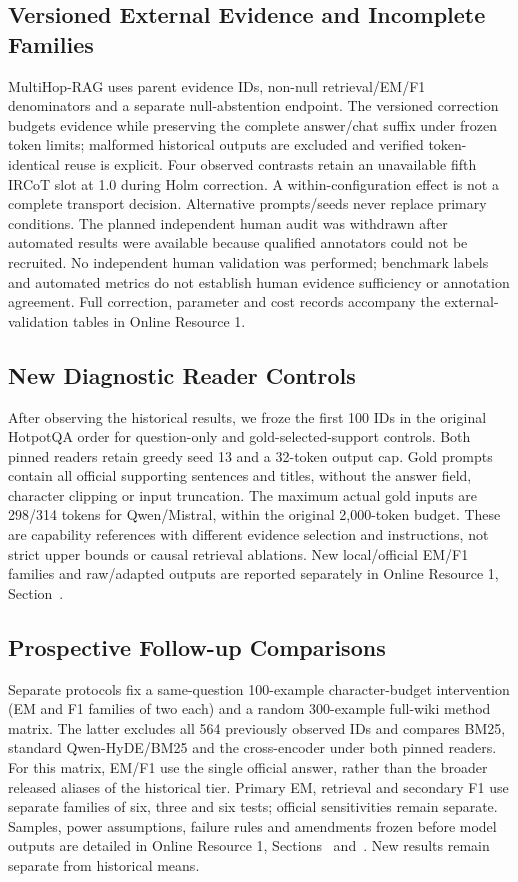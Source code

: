 \subsection{Versioned External Evidence and Incomplete Families}
\label{sec:mhrag_method_gate}

MultiHop-RAG uses parent evidence IDs, non-null retrieval/EM/F1 denominators and a separate null-abstention endpoint. The versioned correction budgets evidence while preserving the complete answer/chat suffix under frozen token limits; malformed historical outputs are excluded and verified token-identical reuse is explicit. Four observed contrasts retain an unavailable fifth IRCoT slot at 1.0 during Holm correction. A within-configuration effect is not a complete transport decision. Alternative prompts/seeds never replace primary conditions. The planned independent human audit was withdrawn after automated results were available because qualified annotators could not be recruited. No independent human validation was performed; benchmark labels and automated metrics do not establish human evidence sufficiency or annotation agreement. Full correction, parameter and cost records accompany the external-validation tables in Online Resource 1.

\subsection{New Diagnostic Reader Controls}
\label{sec:new_reader_controls_method}
After observing the historical results, we froze the first 100 IDs in the original HotpotQA order for question-only and gold-selected-support controls. Both pinned readers retain greedy seed 13 and a 32-token output cap. Gold prompts contain all official supporting sentences and titles, without the answer field, character clipping or input truncation. The maximum actual gold inputs are 298/314 tokens for Qwen/Mistral, within the original 2,000-token budget. These are capability references with different evidence selection and instructions, not strict upper bounds or causal retrieval ablations. New local/official EM/F1 families and raw/adapted outputs are reported separately in Online Resource 1, Section~.

\subsection{Prospective Follow-up Comparisons}
\label{sec:followup_comparisons_method}
Separate protocols fix a same-question 100-example character-budget intervention (EM and F1 families of two each) and a random 300-example full-wiki method matrix. The latter excludes all 564 previously observed IDs and compares BM25, standard Qwen-HyDE/BM25 and the cross-encoder under both pinned readers. For this matrix, EM/F1 use the single official answer, rather than the broader released aliases of the historical tier. Primary EM, retrieval and secondary F1 use separate families of six, three and six tests; official sensitivities remain separate. Samples, power assumptions, failure rules and amendments frozen before model outputs are detailed in Online Resource 1, Sections~ and~. New results remain separate from historical means.
